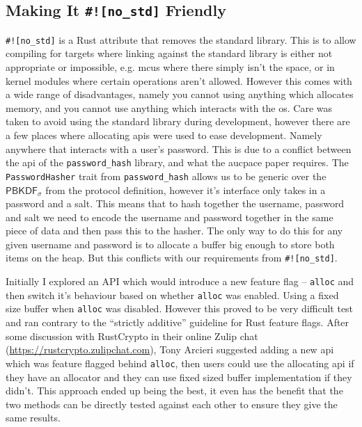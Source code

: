 \subsection{Making It \texttt{\#![no\_std]} Friendly}
\verb|#![no_std]| is a Rust attribute that removes the standard library.
This is to allow compiling for targets where linking against the standard library is either not appropriate or impossible, e.g. \glspl{mcu} where there simply isn't the space, or in kernel modules where certain operations aren't allowed.
However this comes with a wide range of disadvantages, namely you cannot using anything which allocates memory, and you cannot use anything which interacts with the \gls{os}.
Care was taken to avoid using the standard library during development, however there are a few places where allocating \glspl{api} were used to ease development.
Namely anywhere that interacts with a user's password.
This is due to a conflict between the \gls{api} of the \texttt{password\_hash} library, and what the \gls{aucpace} paper requires.
The \texttt{PasswordHasher} trait from \texttt{password\_hash} allows us to be generic over the $\textsf{PBKDF}_{\sigma}$ from the protocol definition, however it's interface only takes in a password and a salt.
This means that to hash together the username, password and salt we need to encode the username and password together in the same piece of data and then pass this to the hasher.
The only way to do this for any given username and password is to allocate a buffer big enough to store both items on the heap.
But this conflicts with our requirements from \verb|#![no_std]|.

Initially I explored an API which would introduce a new feature flag -- \texttt{alloc} and then switch it's behaviour based on whether \texttt{alloc} was enabled.
Using a fixed size buffer when \texttt{alloc} was disabled.
However this proved to be very difficult test and ran contrary to the \enquote{strictly additive} guideline for Rust feature flags.
After some discussion with RustCrypto in their online Zulip chat (\url{https://rustcrypto.zulipchat.com}), Tony Arcieri
suggested adding a new \gls{api} which was feature flagged behind \texttt{alloc}, then users could use the allocating \gls{api} if they have an allocator and they can use fixed sized buffer implementation if they didn't.
This approach ended up being the best, it even has the benefit that the two methods can be directly tested against each other to ensure they give the same results.

